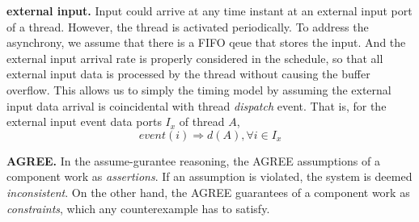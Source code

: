 {\bf external input.} 
Input could arrive at any time instant at an external input port of a thread. However, the thread is activated periodically. To address the asynchrony, we assume that there is a FIFO qeue that stores the input. And the external input arrival rate is properly considered in the schedule, so that all external input data is processed by the thread without causing the buffer overflow. This allows us to simply the timing model by assuming the external input data arrival is coincidental with thread \emph{dispatch} event. That is, for the external input event data ports $I_x$ of thread $A$, 
$$ event(i) \Rightarrow d(A), \forall i \in I_x $$

{\bf AGREE.}
In the assume-gurantee reasoning, the AGREE assumptions of a component work as \emph{assertions}. If an assumption is violated, the system is deemed \emph{inconsistent}. On the other hand, the AGREE guarantees of a component work as \emph{constraints}, which any counterexample has to satisfy.







